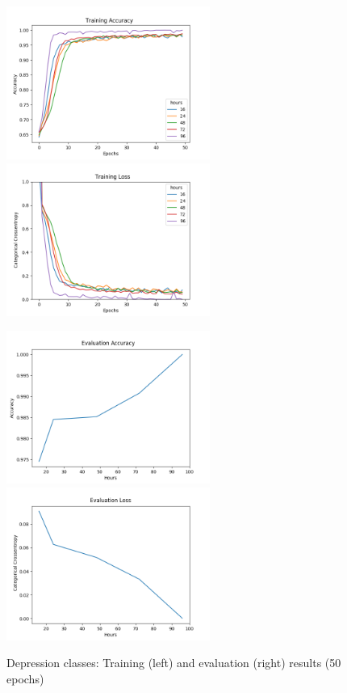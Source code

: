 \begin{figure}[h]
      \begin{multicols}{2}
            \includegraphics[height=5cm]{img/depression_class/plot_acc_train.png}
            \includegraphics[height=5cm]{img/depression_class/plot_loss_train.png}

            \includegraphics[height=5cm]{img/depression_class/plot_acc_eval.png}
            \includegraphics[height=5cm]{img/depression_class/plot_loss_eval.png}
      \end{multicols}
      \caption{Depression classes: Training (left) and evaluation (right) results (50 epochs)}
      \label{figure:depression_class_50e}
\end{figure}

